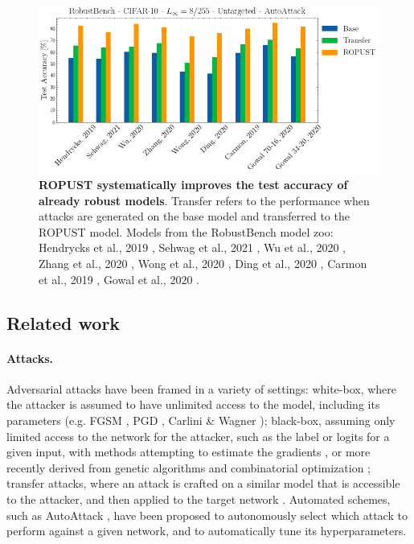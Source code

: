 \documentclass{article}
\begin{document}
\begin{figure}
    \centering
    \includegraphics[width=\textwidth]{robustbench_lead.png}
    \caption{\textbf{ROPUST systematically improves the test accuracy of already robust models}. Transfer refers to the performance when attacks are generated on the base model and transferred to the ROPUST model. Models from the RobustBench model zoo: Hendrycks et al., 2019 \cite{Hendrycks2019UsingPC}, Sehwag et al., 2021 \cite{Sehwag2021ImprovingAR}, Wu et al., 2020 \cite{Wu2020AdversarialWP}, Zhang et al., 2020 \cite{Zhang2020GeometryawareIA}, Wong et al., 2020 \cite{Wong2020FastIB}, Ding et al., 2020 \cite{Ding2020MaxMarginA}, Carmon et al., 2019 \cite{Carmon2019UnlabeledDI}, Gowal et al., 2020 \cite{Gowal2020UncoveringTL}.}
    \label{fig:robustbench}
\end{figure}

\subsection{Related work}
\paragraph{Attacks.} Adversarial attacks have been framed in a variety of settings: white-box, where the attacker is assumed to have unlimited access to the model, including its parameters (e.g. FGSM \cite{Goodfellow2015ExplainingAH}, PGD \cite{madry2017towards, kurakin2016adversarial}, Carlini \& Wagner \cite{carlini2017towards}); black-box, assuming only limited access to the network for the attacker, such as the label or logits for a given input, with methods attempting to estimate the gradients \cite{chen2017zoo,ilyas2018black,ilyas2018prior}, or more recently derived from genetic algorithms \cite{andriushchenko2019square,meunier2019yet} and combinatorial optimization \cite{moon19aparsimonous}; transfer attacks, where an attack is crafted on a similar model that is accessible to the attacker, and then applied to the target network \cite{papernot2016transferability}. Automated schemes, such as AutoAttack \cite{Croce2020ReliableEO}, have been proposed to  autonomously select which attack to perform against a given network, and to automatically tune its hyperparameters. 
\end{document}

